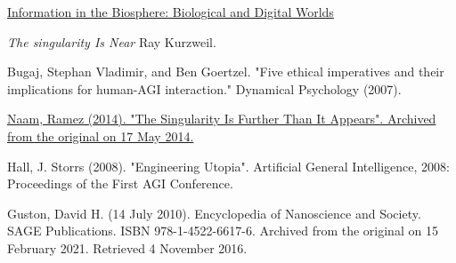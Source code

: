 \documentclass[a4paper]{article}
\begin{document}
\begin{thebibliography}{9}
\href{https://escholarship.org/uc/item/38f4b791}{Information in the Biosphere: Biological and Digital Worlds}

 \textit{The singularity Is Near} Ray Kurzweil.

  Bugaj, Stephan Vladimir, and Ben Goertzel. "Five ethical imperatives and their implications for human-AGI interaction." Dynamical Psychology (2007).

\href{ http://www.antipope.org/charlie/blog-static/2014/02/the-singularity-is-further-tha.html } {Naam, Ramez (2014). "The Singularity Is Further Than It Appears". Archived from the original on 17 May 2014.}

 Hall, J. Storrs (2008). "Engineering Utopia". Artificial General Intelligence, 2008: Proceedings of the First AGI Conference.


 Guston, David H. (14 July 2010). Encyclopedia of Nanoscience and Society. SAGE Publications. ISBN 978-1-4522-6617-6. Archived from the original on 15 February 2021. Retrieved 4 November 2016.

\end{thebibliography}
\end{document}
